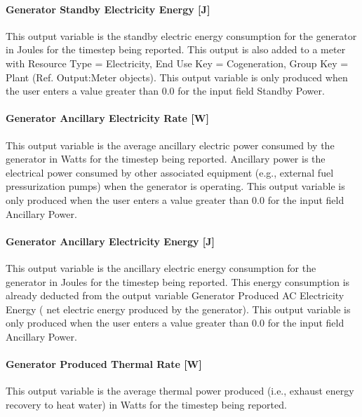 \paragraph{Generator Standby Electricity Energy {[}J{]}}\label{generator-standby-electric-energy-j}

This output variable is the standby electric energy consumption for the generator in Joules for the timestep being reported. This output is also added to a meter with Resource Type = Electricity, End Use Key = Cogeneration, Group Key = Plant (Ref. Output:Meter objects). This output variable is only produced when the user enters a value greater than 0.0 for the input field Standby Power.

\paragraph{Generator Ancillary Electricity Rate {[}W{]}}\label{generator-ancillary-electric-power-w}

This output variable is the average ancillary electric power consumed by the generator in Watts for the timestep being reported. Ancillary power is the electrical power consumed by other associated equipment (e.g., external fuel pressurization pumps) when the generator is operating. This output variable is only produced when the user enters a value greater than 0.0 for the input field Ancillary Power.

\paragraph{Generator Ancillary Electricity Energy {[}J{]}}\label{generator-ancillary-electric-energy-j}

This output variable is the ancillary electric energy consumption for the generator in Joules for the timestep being reported. This energy consumption is already deducted from the output variable Generator Produced AC Electricity Energy ( net electric energy produced by the generator). This output variable is only produced when the user enters a value greater than 0.0 for the input field Ancillary Power.

\paragraph{Generator Produced Thermal Rate {[}W{]}}\label{generator-produced-thermal-rate-w-1}

This output variable is the average thermal power produced (i.e., exhaust energy recovery to heat water) in Watts for the timestep being reported.

